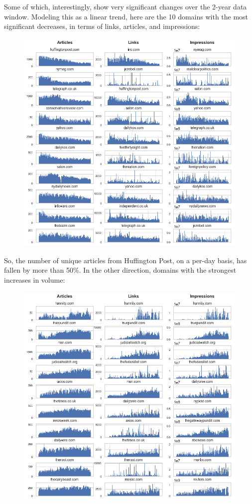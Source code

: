 \documentclass{scrartcl}
\begin{document}
Some of which, interestingly, show very significant changes over the 2-year data window. Modeling this as a linear trend, here are the 10 domains with the most significant decreases, in terms of links, articles, and impressions:

\begin{figure}[H]
  \centering
  \includegraphics[height=0.6\textheight]{figures/vol-dec.png}
\end{figure}

So, the number of unique articles from Huffington Post, on a per-day basis, has fallen by more than 50\%. In the other direction, domains with the strongest increases in volume:

\begin{figure}[H]
  \centering
  \includegraphics[height=0.6\textheight]{figures/vol-inc.png}
\end{figure}
\end{document}
